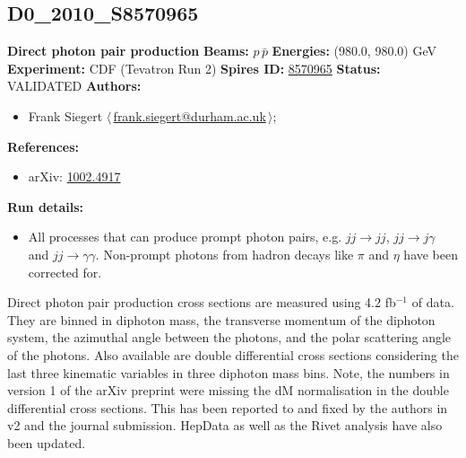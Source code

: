 \subsection[D0\_2010\_S8570965]{D0\_2010\_S8570965\,\cite{Abazov:2010ah}}
\textbf{Direct photon pair production}\newline
\textbf{Beams:} $p$\,$\bar{p}$ \newline
\textbf{Energies:} (980.0, 980.0) GeV \newline
\textbf{Experiment:} CDF (Tevatron Run 2) \newline
\textbf{Spires ID:} \href{http://www.slac.stanford.edu/spires/find/hep/www?rawcmd=key+8570965}{8570965}\newline
\textbf{Status:} VALIDATED\newline
\textbf{Authors:}
\begin{itemize}
  \item Frank Siegert $\langle\,$\href{mailto:frank.siegert@durham.ac.uk}{frank.siegert@durham.ac.uk}$\,\rangle$;
\end{itemize}
\textbf{References:}
\begin{itemize}
  \item arXiv: \href{http://arxiv.org/abs/1002.4917}{1002.4917}
\end{itemize}
\textbf{Run details:}
\begin{itemize}

  \item All processes that can produce prompt photon pairs, e.g. $jj \to jj$, $jj \to j\gamma$ and $jj \to \gamma \gamma$. Non-prompt photons from hadron decays like $\pi$ and $\eta$ have been corrected for.\end{itemize}

\noindent Direct photon pair production cross sections are measured using 4.2 fb$^{-1}$ of data. They are binned in diphoton mass, the transverse momentum of the diphoton system, the azimuthal angle between the photons, and the polar scattering angle of the photons. Also available are double differential cross sections considering the last three kinematic variables in three diphoton mass bins. Note, the numbers in version 1 of the arXiv preprint were missing the dM normalisation in the double differential cross sections. This has been reported to and fixed by the authors in v2 and the journal submission. HepData as well as the Rivet analysis have also been updated.

\clearpage



